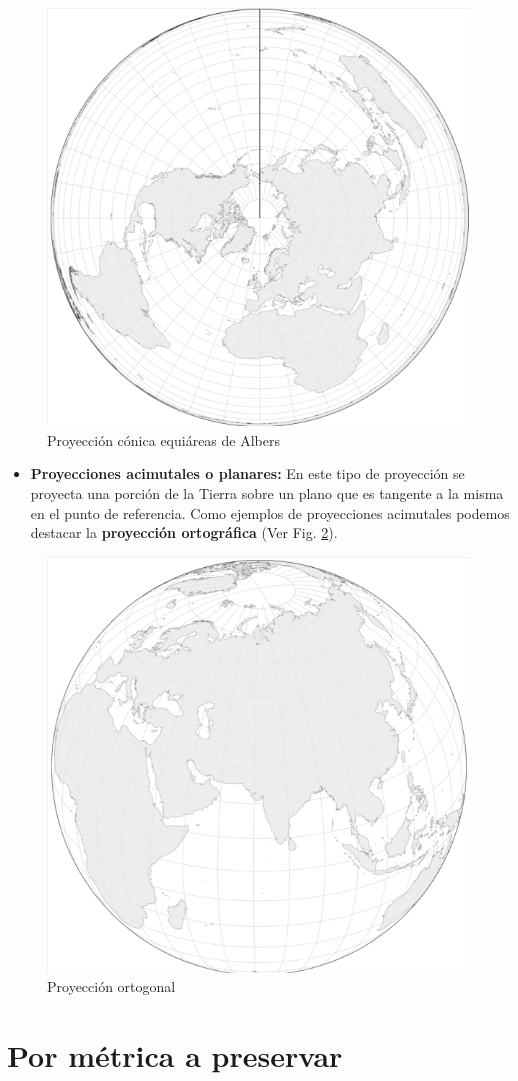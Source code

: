 \documentclass[
]{report}
\providecommand{\tightlist}{%
  \setlength{\itemsep}{0pt}\setlength{\parskip}{0pt}}
\theoremstyle{definition}
\theoremstyle{definition}
\theoremstyle{definition}
\theoremstyle{definition}
\theoremstyle{remark}
\begin{document}
\begin{figure}

{\centering \includegraphics[width=0.4\linewidth]{img/albers_conic} 

}

\caption{Proyección cónica equiáreas de Albers}\label{fig:albers}
\end{figure}

\begin{itemize}
\tightlist
\item
  \textbf{Proyecciones acimutales o planares:} En este tipo de proyección se
  proyecta una porción de la Tierra sobre un plano que es tangente a la misma
  en el punto de referencia. Como ejemplos de proyecciones acimutales podemos
  destacar la \textbf{proyección ortográfica} (Ver Fig. \ref{fig:orto}).
\end{itemize}

\begin{figure}

{\centering \includegraphics[width=0.4\linewidth]{img/orto} 

}

\caption{Proyección ortogonal}\label{fig:orto}
\end{figure}

\hypertarget{por-muxe9trica-a-preservar}{%
\section{Por métrica a preservar}\label{por-muxe9trica-a-preservar}}
\end{document}
